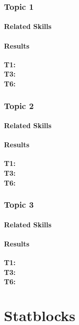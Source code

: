 \documentclass{ShadowTeXSR5}
\begin{document}
\subsection{Topic 1}
\lipsum[1]
\subsubsection{Related Skills}
\lipsum[1]
\subsubsection{Results}
\textbf{T1:}\\
\textbf{T3:}\\
\textbf{T6:}\\

\subsection{Topic 2}
\lipsum[1]
\subsubsection{Related Skills}
\lipsum[1]
\subsubsection{Results}
\lipsum[1]
\textbf{T1:}\\
\textbf{T3:}\\
\textbf{T6:}\\

\subsection{Topic 3}
\lipsum[1]
\subsubsection{Related Skills}
\lipsum[1]
\subsubsection{Results}
\lipsum[1]
\textbf{T1:}\\
\textbf{T3:}\\
\textbf{T6:}\\


\chapter{Statblocks}
\end{document}
